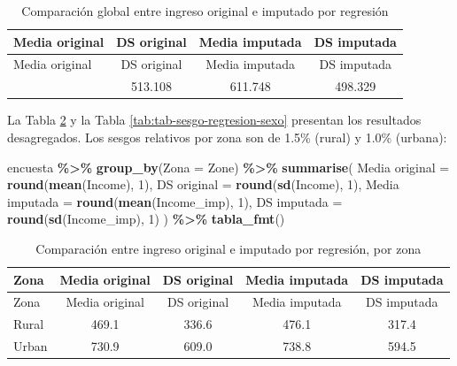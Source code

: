\documentclass[
  spanish,
  12pt,
]{book}
\newenvironment{Shaded}{\begin{snugshade}}{\end{snugshade}}
\newcommand{\AttributeTok}[1]{\textcolor[rgb]{0.13,0.29,0.53}{#1}}
\newcommand{\DecValTok}[1]{\textcolor[rgb]{0.00,0.00,0.81}{#1}}
\newcommand{\FunctionTok}[1]{\textcolor[rgb]{0.13,0.29,0.53}{\textbf{#1}}}
\newcommand{\NormalTok}[1]{#1}
\newcommand{\OtherTok}[1]{\textcolor[rgb]{0.56,0.35,0.01}{#1}}
\newcommand{\SpecialCharTok}[1]{\textcolor[rgb]{0.81,0.36,0.00}{\textbf{#1}}}
\newcommand{\StringTok}[1]{\textcolor[rgb]{0.31,0.60,0.02}{#1}}
\begin{document}
\begin{longtable}[]{@{}lccc@{}}
\caption{\label{tab:tab-sesgo-regresion-global}Comparación global entre ingreso original e imputado por regresión}\tabularnewline
\toprule\noalign{}
Media original & DS original & Media imputada & DS imputada \\
\midrule\noalign{}
\endfirsthead
\toprule\noalign{}
Media original & DS original & Media imputada & DS imputada \\
\midrule\noalign{}
\endhead
\bottomrule\noalign{}
\endlastfoot
604.249 & 513.108 & 611.748 & 498.329 \\
\end{longtable}

La Tabla \ref{tab:tab-sesgo-regresion-zona} y la Tabla \ref{tab:tab-sesgo-regresion-sexo} presentan los resultados desagregados. Los sesgos relativos por zona son de 1.5\% (rural) y 1.0\% (urbana):

\begin{Shaded}
\begin{Highlighting}[]
\NormalTok{encuesta }\SpecialCharTok{\%\textgreater{}\%}
  \FunctionTok{group\_by}\NormalTok{(}\AttributeTok{Zona =}\NormalTok{ Zone) }\SpecialCharTok{\%\textgreater{}\%}
  \FunctionTok{summarise}\NormalTok{(}
    \StringTok{\textasciigrave{}}\AttributeTok{Media original}\StringTok{\textasciigrave{}}  \OtherTok{=} \FunctionTok{round}\NormalTok{(}\FunctionTok{mean}\NormalTok{(Income), }\DecValTok{1}\NormalTok{),}
    \StringTok{\textasciigrave{}}\AttributeTok{DS original}\StringTok{\textasciigrave{}}     \OtherTok{=} \FunctionTok{round}\NormalTok{(}\FunctionTok{sd}\NormalTok{(Income), }\DecValTok{1}\NormalTok{),}
    \StringTok{\textasciigrave{}}\AttributeTok{Media imputada}\StringTok{\textasciigrave{}}  \OtherTok{=} \FunctionTok{round}\NormalTok{(}\FunctionTok{mean}\NormalTok{(Income\_imp), }\DecValTok{1}\NormalTok{),}
    \StringTok{\textasciigrave{}}\AttributeTok{DS imputada}\StringTok{\textasciigrave{}}     \OtherTok{=} \FunctionTok{round}\NormalTok{(}\FunctionTok{sd}\NormalTok{(Income\_imp), }\DecValTok{1}\NormalTok{)}
\NormalTok{  ) }\SpecialCharTok{\%\textgreater{}\%} \FunctionTok{tabla\_fmt}\NormalTok{()}
\end{Highlighting}
\end{Shaded}

\begin{longtable}[]{@{}lcccc@{}}
\caption{\label{tab:tab-sesgo-regresion-zona}Comparación entre ingreso original e imputado por regresión, por zona}\tabularnewline
\toprule\noalign{}
Zona & Media original & DS original & Media imputada & DS imputada \\
\midrule\noalign{}
\endfirsthead
\toprule\noalign{}
Zona & Media original & DS original & Media imputada & DS imputada \\
\midrule\noalign{}
\endhead
\bottomrule\noalign{}
\endlastfoot
Rural & 469.1 & 336.6 & 476.1 & 317.4 \\
Urban & 730.9 & 609.0 & 738.8 & 594.5 \\
\end{longtable}
\end{document}

